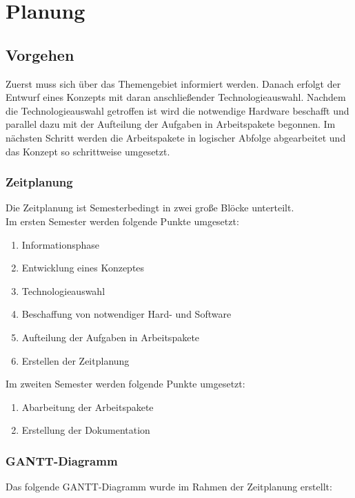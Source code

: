 \chapter{Planung}

\section{Vorgehen}

Zuerst muss sich über das Themengebiet informiert werden. Danach erfolgt der
Entwurf eines Konzepts mit daran anschließender Technologieauswahl. Nachdem die
Technologieauswahl getroffen ist wird die notwendige Hardware beschafft und
parallel dazu mit der Aufteilung der Aufgaben in Arbeitspakete begonnen. Im
nächsten Schritt werden die Arbeitspakete in logischer Abfolge abgearbeitet und
das Konzept so schrittweise umgesetzt.

\subsection{Zeitplanung}

Die Zeitplanung ist Semesterbedingt in zwei große Blöcke unterteilt.\\
Im ersten Semester werden folgende Punkte umgesetzt:

\begin{enumerate}
  \item Informationsphase
  \item Entwicklung eines Konzeptes
  \item Technologieauswahl
  \item Beschaffung von notwendiger Hard- und Software
  \item Aufteilung der Aufgaben in Arbeitspakete
  \item Erstellen der Zeitplanung
\end{enumerate}

Im zweiten Semester werden folgende Punkte umgesetzt:

\begin{enumerate}
  \item Abarbeitung der Arbeitspakete
  \item Erstellung der Dokumentation
\end{enumerate}

\subsection{GANTT-Diagramm}

Das folgende GANTT-Diagramm wurde im Rahmen der Zeitplanung erstellt:

